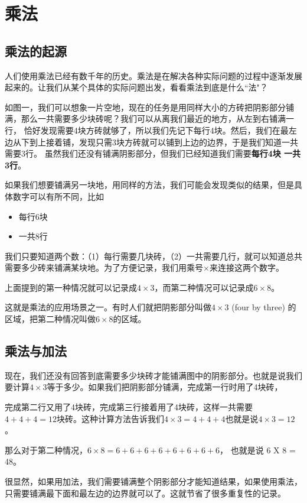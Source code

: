 \chapter{乘法}

\section{乘法的起源}
人们使用乘法已经有数千年的历史。乘法是在解决各种实际问题的过程中逐渐发展起来的。让我们从某个具体的实际问题出发，看看乘法到底是什么``法"？

如图一，我们可以想象一片空地，现在的任务是用同样大小的方砖把阴影部分铺满，那么一共需要多少块砖呢？我们可以从离我们最近的地方，从左到右铺满一行， 恰好发现需要4块方砖就够了，所以我们先记下每行4块。然后，我们在最左边从下到上接着铺，发现只需3块方砖就可以铺到上边的边界，于是我们知道一共需要3行。 虽然我们还没有铺满阴影部分，但我们已经知道我们需要\textbf{每行4块 一共3行}。

如果我们想要铺满另一块地，用同样的方法，我们可能会发现类似的结果，但是具体数字可以有所不同，比如
\begin{itemize}
    \item 每行6块
    \item 一共8行
\end{itemize}
我们只要知道两个数：（1）每行需要几块砖，（2）一共需要几行，就可以知道总共需要多少砖来铺满某块地。为了方便记录，我们用乘号$\times$来连接这两个数字。

上面提到的第一种情况就可以记录成$4\times3$，而第二种情况可以记录成$6\times8$。

这就是乘法的应用场景之一。有时人们就把阴影部分叫做$4\times3$ (four by three) 的区域，把第二种情况叫做$6\times8$的区域。

\section{乘法与加法}
现在，我们还没有回答到底需要多少块砖才能铺满图中的阴影部分。也就是说我们要计算$4\times3$等于多少。如果我们把阴影部分铺满，完成第一行时用了4块砖，

完成第二行又用了4块砖，完成第三行接着用了4块砖，这样一共需要$4 + 4 + 4 = 12$块砖。这种计算方法告诉我们$4\times3 = 4 + 4 + 4$也就是说$4\times 3 = 12$。

那么对于第二种情况，$6\times 8 = 6 + 6 + 6 + 6 + 6 + 6 + 6 + 6$， 也就是说 6 X 8 = 48。

很显然，如果用加法，我们需要铺满整个阴影部分才能知道结果，如果使用乘法，只需要铺满最下面和最左边的边界就可以了。这就节省了很多重复性的记录。

